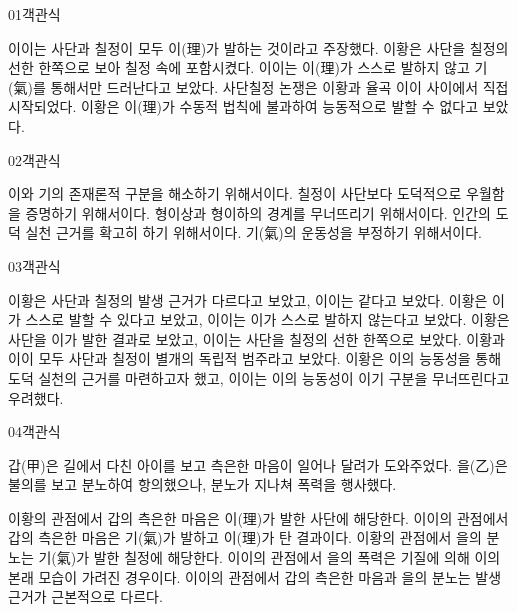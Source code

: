 \documentclass[fs85,seriesWit]{korfarm-base}
\begin{document}
\kfBeginMC
\begin{kfQBlock}{01}{객관식}
\begin{kfChoices}
\kfChoice 이이는 사단과 칠정이 모두 이(理)가 발하는 것이라고 주장했다.
\kfChoice 이황은 사단을 칠정의 선한 한쪽으로 보아 칠정 속에 포함시켰다.
\kfChoice 이이는 이(理)가 스스로 발하지 않고 기(氣)를 통해서만 드러난다고 보았다.
\kfChoice 사단칠정 논쟁은 이황과 율곡 이이 사이에서 직접 시작되었다.
\kfChoice 이황은 이(理)가 수동적 법칙에 불과하여 능동적으로 발할 수 없다고 보았다.
\end{kfChoices}
\end{kfQBlock}

\begin{kfQBlock}{02}{객관식}
\begin{kfChoices}
\kfChoice 이와 기의 존재론적 구분을 해소하기 위해서이다.
\kfChoice 칠정이 사단보다 도덕적으로 우월함을 증명하기 위해서이다.
\kfChoice 형이상과 형이하의 경계를 무너뜨리기 위해서이다.
\kfChoice 인간의 도덕 실천 근거를 확고히 하기 위해서이다.
\kfChoice 기(氣)의 운동성을 부정하기 위해서이다.
\end{kfChoices}
\end{kfQBlock}

\begin{kfQBlock}{03}{객관식}
\begin{kfChoices}
\kfChoice 이황은 사단과 칠정의 발생 근거가 다르다고 보았고, 이이는 같다고 보았다.
\kfChoice 이황은 이가 스스로 발할 수 있다고 보았고, 이이는 이가 스스로 발하지 않는다고 보았다.
\kfChoice 이황은 사단을 이가 발한 결과로 보았고, 이이는 사단을 칠정의 선한 한쪽으로 보았다.
\kfChoice 이황과 이이 모두 사단과 칠정이 별개의 독립적 범주라고 보았다.
\kfChoice 이황은 이의 능동성을 통해 도덕 실천의 근거를 마련하고자 했고, 이이는 이의 능동성이 이기 구분을 무너뜨린다고 우려했다.
\end{kfChoices}
\end{kfQBlock}

\begin{kfQBlock}{04}{객관식}
\begin{kfEvidence}갑(甲)은 길에서 다친 아이를 보고 측은한 마음이 일어나 달려가 도와주었다. 을(乙)은 불의를 보고 분노하여 항의했으나, 분노가 지나쳐 폭력을 행사했다.\end{kfEvidence}
\begin{kfChoices}
\kfChoice 이황의 관점에서 갑의 측은한 마음은 이(理)가 발한 사단에 해당한다.
\kfChoice 이이의 관점에서 갑의 측은한 마음은 기(氣)가 발하고 이(理)가 탄 결과이다.
\kfChoice 이황의 관점에서 을의 분노는 기(氣)가 발한 칠정에 해당한다.
\kfChoice 이이의 관점에서 을의 폭력은 기질에 의해 이의 본래 모습이 가려진 경우이다.
\kfChoice 이이의 관점에서 갑의 측은한 마음과 을의 분노는 발생 근거가 근본적으로 다르다.
\end{kfChoices}
\end{kfQBlock}
\end{document}
